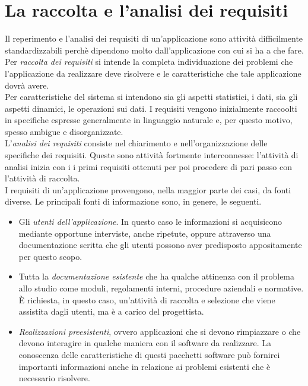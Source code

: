 \documentclass[12pt]{report}
\begin{document}
 	\section{La raccolta e l'analisi dei requisiti}
 	Il reperimento e l'analisi dei requisiti di un'applicazione sono attività difficilmente standardizzabili perchè dipendono molto dall'applicazione con cui si ha a che fare. \\
 	Per \textit{raccolta dei requisiti} si intende la completa individuazione dei problemi che l'applicazione da realizzare deve risolvere e le caratteristiche che tale applicazione dovrà avere. \\
 	Per caratteristiche del sistema si intendono sia gli aspetti statistici, i dati, sia gli aspetti dinamici, le operazioni sui dati. I requisiti vengono inizialmente raccoolti in specifiche espresse generalmente in linguaggio naturale e, per questo motivo, spesso ambigue e disorganizzate. \\
 	L'\textit{analisi dei requisiti} consiste nel chiarimento e nell'organizzazione delle specifiche dei requisiti. Queste sono attività fortmente interconnesse: l'attività di analisi inizia con i i primi requisiti ottenuti per poi procedere di pari passo con l'attività di raccolta. \\
 	I requisiti di un'applicazione provengono, nella maggior parte dei casi, da fonti diverse. Le principali fonti di informazione sono, in genere, le seguenti.
 	\begin{itemize}
 		\item Gli \textit{utenti dell'applicazione}. In questo caso le informazioni si acquisicono mediante opportune interviste, anche ripetute, oppure attraverso una documentazione scritta che gli utenti possono aver predisposto appositamente per questo scopo.
 		\item Tutta la \textit{documentazione esistente} che ha qualche attinenza con il problema allo studio come moduli, regolamenti interni, procedure aziendali e normative. È richiesta, in questo caso, un'attività di raccolta e selezione che viene assistita dagli utenti, ma è a carico del progettista.
 		\item \textit{Realizzazioni preesistenti}, ovvero applicazioni che si devono rimpiazzare o che devono interagire in qualche maniera con il software da realizzare. La conoscenza delle caratteristiche di questi pacchetti software può fornirci importanti informazioni anche in relazione ai problemi esistenti che è necessario risolvere.
 	\end{itemize}
\end{document}
